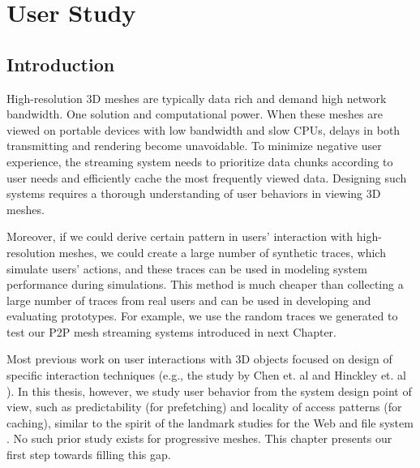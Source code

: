 \chapter{User Study}
\label{c:user}
\section{Introduction}

High-resolution 3D meshes are typically data rich and demand high network bandwidth. 
One solution and computational power. 
When these meshes are viewed on portable devices with
low bandwidth and slow CPUs, delays in both transmitting and
rendering become unavoidable. To minimize negative user experience, the
streaming system needs to prioritize data chunks according to user needs and
efficiently cache the most frequently viewed data.  Designing such
systems requires a thorough understanding of user behaviors in viewing 3D
meshes.

Moreover, if we could derive certain pattern in users' interaction with
high-resolution meshes, we could create a large number of synthetic traces,
which simulate users' actions, and these traces can be used in modeling system
performance during simulations. This method is much cheaper than collecting 
a large number of traces from real users and can be used in developing and evaluating
prototypes. For example, we use the random traces we generated to test our P2P mesh
streaming systems introduced in next Chapter.

Most previous work on user interactions with 3D objects
focused on design of specific interaction
techniques
(e.g., the study by Chen et. al \cite{chen88study} and Hinckley et. al \cite{hinckley97usability}). 
In this thesis, however, we study
user behavior from the system design point of view, 
such as predictability (for prefetching) and locality of access patterns (for caching),
similar to the spirit of the landmark studies for the Web \cite{huberman98web} and file system \cite{ousterhout85trace}.  
No such prior study exists for progressive meshes. This chapter presents our first step towards filling 
this gap.


